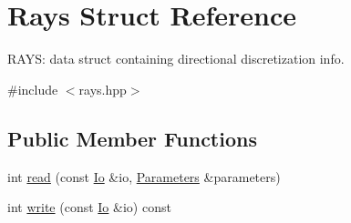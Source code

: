 \hypertarget{structRays}{}\section{Rays Struct Reference}
\label{structRays}


R\+A\+YS\+: data struct containing directional discretization info.  




{\ttfamily \#include $<$rays.\+hpp$>$}

\subsection*{Public Member Functions}
\begin{DoxyCompactItemize}
\item 
int \mbox{\hyperlink{structRays_af90c503c26516728ffd0d896c169608a}{read}} (const \mbox{\hyperlink{structIo}{Io}} \&io, \mbox{\hyperlink{classParameters}{Parameters}} \&parameters)
\item 
int \mbox{\hyperlink{structRays_ad7dea515bc1a0121cc874c58f7a39416}{write}} (const \mbox{\hyperlink{structIo}{Io}} \&io) const
\end{DoxyCompactItemize}
